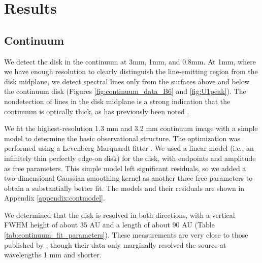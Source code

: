 \documentclass[twocolumn]{aastex61}
\newcommand{\sourcei}{SrcI\xspace}
\begin{document}


\section{Results}
\label{sec:results}

\subsection{Continuum}
We detect the disk in the continuum at 3mm, 1mm, and 0.8mm.  At 1mm, where we
have enough resolution to clearly distinguish the line-emitting region from the
disk midplane, we detect spectral lines only from the surfaces above and below the
continuum disk (Figures \ref{fig:continuum_data_B6} and \ref{fig:U1peak}).
The nondetection of lines in the disk midplane is a strong indication that the
continuum is optically thick, as has previously been noted
\citep[e.g.,][]{Plambeck2016a}.


We fit the highest-resolution 1.3 mm and 3.2 mm continuum image with a simple
model to determine the basic
observational structure.
The optimization was performed using a Levenberg-Marquardt
fitter \citep{Newville2014a}. 
We used a linear model (i.e., an infinitely thin
perfectly edge-on disk) for the disk, with endpoints and amplitude as free parameters.
This simple model left significant residuals, so we added a two-dimensional
Gaussian smoothing kernel as another three free parameters to obtain a
substantially better fit.
The models and their residuals
are shown in Appendix \ref{appendix:contmodel}.

We determined that the disk is resolved in both
directions, with a vertical FWHM height of about 35 AU and a length of about
90 AU (Table \ref{tab:continuum_fit_parameters}).  These measurements
are very close to those published by \citet{Plambeck2016a}, though their data
only marginally resolved the source at wavelengths 1 mm and shorter.
\end{document}
